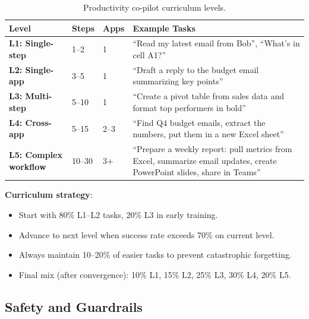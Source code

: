 \begin{table}[ht!]
\centering
\caption{Productivity co-pilot curriculum levels.}
{\small
\begin{tabular}{@{}lllp{7.5cm}@{}}
\toprule
\textbf{Level} & \textbf{Steps} & \textbf{Apps} & \textbf{Example Tasks} \\
\midrule
\textbf{L1: Single-step} & 1--2 & 1 & ``Read my latest email from Bob'', ``What’s in cell A1?'' \\
\textbf{L2: Single-app} & 3--5 & 1 & ``Draft a reply to the budget email summarizing key points'' \\
\textbf{L3: Multi-step} & 5--10 & 1 & ``Create a pivot table from sales data and format top performers in bold'' \\
\textbf{L4: Cross-app} & 5--15 & 2--3 & ``Find Q4 budget emails, extract the numbers, put them in a new Excel sheet'' \\
\textbf{L5: Complex workflow} & 10--30 & 3+ & ``Prepare a weekly report: pull metrics from Excel, summarize email updates, create PowerPoint slides, share in Teams'' \\
\bottomrule
\end{tabular}
}
\end{table}

\textbf{Curriculum strategy}:

\begin{itemize}
  \item Start with 80\% L1--L2 tasks, 20\% L3 in early training.
  \item Advance to next level when success rate exceeds 70\% on current level.
  \item Always maintain 10--20\% of easier tasks to prevent catastrophic forgetting.
  \item Final mix (after convergence): 10\% L1, 15\% L2, 25\% L3, 30\% L4, 20\% L5.
\end{itemize}

\subsection{Safety and Guardrails}
\label{safety-and-guardrails}

